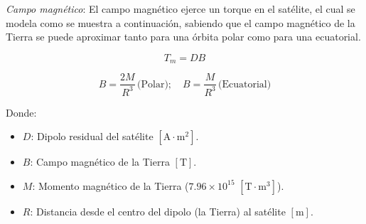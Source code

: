 \textit{Campo magnético}: El campo magnético ejerce un torque en el satélite, el cual se modela como se muestra a continuación, sabiendo que el campo magnético de la Tierra se puede aproximar tanto para una órbita polar como para una ecuatorial.

\[
T_m = D B
\]

\[
B = \frac{2M}{R^3} \, \text{(Polar)}; \quad B = \frac{M}{R^3} \, \text{(Ecuatorial)}
\]

Donde:
\begin{itemize}
	\item $D$: Dipolo residual del satélite $[\text{A} \cdot \text{m}^2]$.
	\item $B$: Campo magnético de la Tierra $[\text{T}]$.
	\item $M$: Momento magnético de la Tierra ($7.96 \times 10^{15}$ $[\text{T} \cdot \text{m}^3]$).
	\item $R$: Distancia desde el centro del dipolo (la Tierra) al satélite $[\text{m}]$.
\end{itemize}